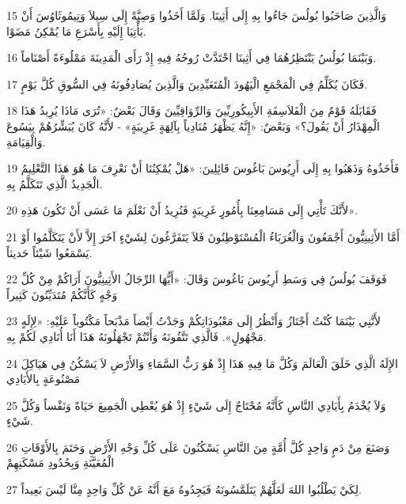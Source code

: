 \par 15 وَالَّذِينَ صَاحَبُوا بُولُسَ جَاءُوا بِهِ إِلَى أَثِينَا. وَلَمَّا أَخَذُوا وَصِيَّةً إِلَى سِيلاَ وَتِيمُوثَاوُسَ أَنْ يَأْتِيَا إِلَيْهِ بِأَسْرَعِ مَا يُمْكِنُ مَضَوْا.
\par 16 وَبَيْنَمَا بُولُسُ يَنْتَظِرُهُمَا فِي أَثِينَا احْتَدَّتْ رُوحُهُ فِيهِ إِذْ رَأَى الْمَدِينَةَ مَمْلُوءَةً أَصْنَاماً.
\par 17 فَكَانَ يُكَلِّمُ فِي الْمَجْمَعِ الْيَهُودَ الْمُتَعَبِّدِينَ وَالَّذِينَ يُصَادِفُونَهُ فِي السُّوقِ كُلَّ يَوْمٍ.
\par 18 فَقَابَلَهُ قَوْمٌ مِنَ الْفَلاَسِفَةِ الأَبِيكُورِيِّينَ وَالرِّوَاقِيِّينَ وَقَالَ بَعْضٌ: «تُرَى مَاذَا يُرِيدُ هَذَا الْمِهْذَارُ أَنْ يَقُولَ؟» وَبَعْضٌ: «إِنَّهُ يَظْهَرُ مُنَادِياً بِآلِهَةٍ غَرِيبَةٍ» - لأَنَّهُ كَانَ يُبَشِّرُهُمْ بِيَسُوعَ وَالْقِيَامَةِ.
\par 19 فَأَخَذُوهُ وَذَهَبُوا بِهِ إِلَى أَرِيُوسَ بَاغُوسَ قَائِلِينَ: «هَلْ يُمْكِنُنَا أَنْ نَعْرِفَ مَا هُوَ هَذَا التَّعْلِيمُ الْجَدِيدُ الَّذِي تَتَكَلَّمُ بِهِ.
\par 20 لأَنَّكَ تَأْتِي إِلَى مَسَامِعِنَا بِأُمُورٍ غَرِيبَةٍ فَنُرِيدُ أَنْ نَعْلَمَ مَا عَسَى أَنْ تَكُونَ هَذِهِ».
\par 21 أَمَّا الأَثِينِيُّونَ أَجْمَعُونَ وَالْغُرَبَاءُ الْمُسْتَوْطِنُونَ فَلاَ يَتَفَرَّغُونَ لِشَيْءٍ آخَرَ إِلاَّ لأَنْ يَتَكَلَّمُوا أَوْ يَسْمَعُوا شَيْئاً حَديثاً.
\par 22 فَوَقَفَ بُولُسُ فِي وَسَطِ أَرِيُوسَ بَاغُوسَ وَقَالَ: «أَيُّهَا الرِّجَالُ الأَثِينِيُّونَ أَرَاكُمْ مِنْ كُلِّ وَجْهٍ كَأَنَّكُمْ مُتَدَيِّنُونَ كَثِيراً
\par 23 لأَنَّنِي بَيْنَمَا كُنْتُ أَجْتَازُ وَأَنْظُرُ إِلَى مَعْبُودَاتِكُمْ وَجَدْتُ أَيْضاً مَذْبَحاً مَكْتُوباً عَلَيْهِ: «لِإِلَهٍ مَجْهُولٍ». فَالَّذِي تَتَّقُونَهُ وَأَنْتُمْ تَجْهَلُونَهُ هَذَا أَنَا أُنَادِي لَكُمْ بِهِ.
\par 24 الإِلَهُ الَّذِي خَلَقَ الْعَالَمَ وَكُلَّ مَا فِيهِ هَذَا إِذْ هُوَ رَبُّ السَّمَاءِ وَالأَرْضِ لاَ يَسْكُنُ فِي هَيَاكِلَ مَصْنُوعَةٍ بِالأَيَادِي
\par 25 وَلاَ يُخْدَمُ بِأَيَادِي النَّاسِ كَأَنَّهُ مُحْتَاجٌ إِلَى شَيْءٍ إِذْ هُوَ يُعْطِي الْجَمِيعَ حَيَاةً وَنَفْساً وَكُلَّ شَيْءٍ.
\par 26 وَصَنَعَ مِنْ دَمٍ وَاحِدٍ كُلَّ أُمَّةٍ مِنَ النَّاسِ يَسْكُنُونَ عَلَى كُلِّ وَجْهِ الأَرْضِ وَحَتَمَ بِالأَوْقَاتِ الْمُعَيَّنَةِ وَبِحُدُودِ مَسْكَنِهِمْ
\par 27 لِكَيْ يَطْلُبُوا اللهَ لَعَلَّهُمْ يَتَلَمَّسُونَهُ فَيَجِدُوهُ مَعَ أَنَّهُ عَنْ كُلِّ وَاحِدٍ مِنَّا لَيْسَ بَعِيداً.
